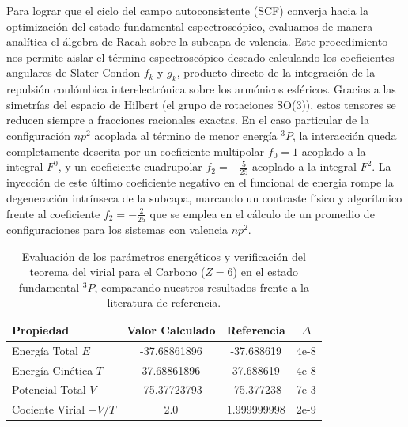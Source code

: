 \documentclass[12pt,a4paper]{book}
\begin{document}
Para lograr que el ciclo del campo autoconsistente (SCF) converja hacia la optimización del estado fundamental espectroscópico, evaluamos de manera analítica el álgebra de Racah sobre la subcapa de valencia. Este procedimiento nos permite aislar el término espectroscópico deseado calculando los coeficientes angulares de Slater-Condon \( f_k \) y \( g_k \), producto directo de la integración de la repulsión coulómbica interelectrónica sobre los armónicos esféricos. Gracias a las simetrías del espacio de Hilbert (el grupo de rotaciones SO(3)), estos tensores se reducen siempre a fracciones racionales exactas. En el caso particular de la configuración \( np^2 \) acoplada al término de menor energía \( ^3P \), la interacción queda completamente descrita por un coeficiente multipolar \( f_0=1 \) acoplado a la integral \( F^0 \), y un coeficiente cuadrupolar \( f_2=-\displaystyle\frac{5}{25} \) acoplado a la integral \( F^2 \). La inyección de este último coeficiente negativo en el funcional de energia rompe la degeneración intrínseca de la subcapa, marcando un contraste físico y algorítmico frente al coeficiente \( f_2 = -\displaystyle\frac{2}{25} \) que se emplea en el cálculo de un promedio de configuraciones para los sistemas con valencia \( np^2 \).


\begin{table}[htbp]
    \centering
    \caption{Evaluación de los parámetros energéticos y verificación del teorema del virial para el Carbono ($Z=6$) en el estado fundamental $^{3}P$, comparando nuestros resultados frente a la literatura de referencia.}
    \label{tab:resultados_energia}
    \begin{tabular}{
        l
        S[table-format=-4.8]
        S[table-format=-4.8]
        S[table-format=1.2e-1]
    }
        \toprule
        {\textbf{Propiedad}} & {\textbf{Valor Calculado}} & {\textbf{Referencia}} & {$\Delta$} \\
        \midrule
        Energía Total $E$ & -37.68861896 & -37.688619 & 4e-8 \\
        Energía Cinética $T$ & 37.68861896 & 37.688619 & 4e-8 \\
        Potencial Total $V$ & -75.37723793 & -75.377238 & 7e-3 \\
        Cociente Virial $-V/T$ & 2.0 & 1.999999998 & 2e-9 \\
        \bottomrule
    \end{tabular}
\end{table}
\end{document}

